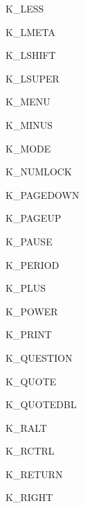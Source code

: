 \begin{datadesc}{K_LESS}
\end{datadesc}
\begin{datadesc}{K_LMETA}
\end{datadesc}
\begin{datadesc}{K_LSHIFT}
\end{datadesc}
\begin{datadesc}{K_LSUPER}
\end{datadesc}
\begin{datadesc}{K_MENU}
\end{datadesc}
\begin{datadesc}{K_MINUS}
\end{datadesc}
\begin{datadesc}{K_MODE}
\end{datadesc}
\begin{datadesc}{K_NUMLOCK}
\end{datadesc}
\begin{datadesc}{K_PAGEDOWN}
\end{datadesc}
\begin{datadesc}{K_PAGEUP}
\end{datadesc}
\begin{datadesc}{K_PAUSE}
\end{datadesc}
\begin{datadesc}{K_PERIOD}
\end{datadesc}
\begin{datadesc}{K_PLUS}
\end{datadesc}
\begin{datadesc}{K_POWER}
\end{datadesc}
\begin{datadesc}{K_PRINT}
\end{datadesc}
\begin{datadesc}{K_QUESTION}
\end{datadesc}
\begin{datadesc}{K_QUOTE}
\end{datadesc}
\begin{datadesc}{K_QUOTEDBL}
\end{datadesc}
\begin{datadesc}{K_RALT}
\end{datadesc}
\begin{datadesc}{K_RCTRL}
\end{datadesc}
\begin{datadesc}{K_RETURN}
\end{datadesc}
\begin{datadesc}{K_RIGHT}
\end{datadesc}
